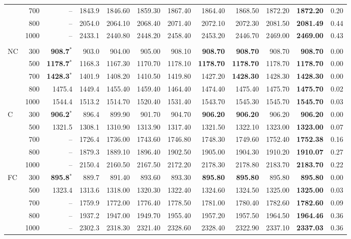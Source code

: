 \begin{table}[htbp]
{\begin{tabular}{lrrrrrrrrrrr}
 & 700 & -- & 1843.9 & 1846.60 & 1859.30 & 1867.40 & 1864.40 & 1868.50 & 1872.20 & \textbf{1872.20} & 0.20 \\
 & 800 & -- & 2054.0 & 2064.10 & 2068.40 & 2071.40 & 2072.10 & 2072.30 & 2081.50 & \textbf{2081.49} & 0.44 \\
 & 1000 & -- & 2433.1 & 2440.80 & 2448.20 & 2458.40 & 2453.20 & 2446.70 & 2469.00 & \textbf{2469.00} & 0.43 \\
\addlinespace
\multicolumn{12}{l}{\emph{Scenario 4}} \\
NC & 300 & \textbf{908.7}$^*$ & 903.0 & 904.00 & 905.00 & 908.10 & \textbf{908.70} & \textbf{908.70} & 908.70 & \textbf{908.70} & 0.00 \\
 & 500 & \textbf{1178.7}$^*$ & 1168.3 & 1167.30 & 1170.70 & 1178.10 & \textbf{1178.70} & \textbf{1178.70} & 1178.70 & \textbf{1178.70} & 0.00 \\
 & 700 & \textbf{1428.3}$^*$ & 1401.9 & 1408.20 & 1410.50 & 1419.80 & 1427.20 & \textbf{1428.30} & 1428.30 & \textbf{1428.30} & 0.00 \\
 & 800 & 1475.4 & 1449.4 & 1455.40 & 1459.40 & 1464.40 & 1474.40 & 1475.40 & 1475.70 & \textbf{1475.70} & 0.02 \\
 & 1000 & 1544.4 & 1513.2 & 1514.70 & 1520.40 & 1531.40 & 1543.70 & 1545.30 & 1545.70 & \textbf{1545.70} & 0.03 \\
\addlinespace[2pt]
C & 300 & \textbf{906.2}$^*$ & 896.4 & 899.90 & 901.70 & 904.70 & \textbf{906.20} & \textbf{906.20} & 906.20 & \textbf{906.20} & 0.00 \\
 & 500 & 1321.5 & 1308.1 & 1310.90 & 1313.90 & 1317.40 & 1321.50 & 1322.10 & 1323.00 & \textbf{1323.00} & 0.07 \\
 & 700 & -- & 1726.4 & 1736.00 & 1743.60 & 1746.80 & 1748.30 & 1749.60 & 1752.40 & \textbf{1752.38} & 0.16 \\
 & 800 & -- & 1879.3 & 1889.10 & 1896.40 & 1902.50 & 1905.00 & 1904.30 & 1910.20 & \textbf{1910.07} & 0.27 \\
 & 1000 & -- & 2150.4 & 2160.50 & 2167.50 & 2172.20 & 2178.30 & 2178.80 & 2183.70 & \textbf{2183.70} & 0.22 \\
\addlinespace[2pt]
FC & 300 & \textbf{895.8}$^*$ & 889.7 & 891.40 & 893.60 & 893.30 & \textbf{895.80} & \textbf{895.80} & 895.80 & \textbf{895.80} & 0.00 \\
 & 500 & 1323.4 & 1313.6 & 1318.00 & 1320.30 & 1322.40 & 1324.60 & 1324.50 & 1325.00 & \textbf{1325.00} & 0.03 \\
 & 700 & -- & 1759.9 & 1772.00 & 1776.40 & 1778.50 & 1781.00 & 1780.40 & 1782.60 & \textbf{1782.60} & 0.09 \\
 & 800 & -- & 1937.2 & 1947.00 & 1949.70 & 1955.40 & 1957.20 & 1957.50 & 1964.50 & \textbf{1964.46} & 0.36 \\
 & 1000 & -- & 2302.3 & 2318.30 & 2321.40 & 2328.60 & 2328.40 & 2322.90 & 2337.10 & \textbf{2337.03} & 0.36 \\
\bottomrule
\end{tabular}}
\end{table}
